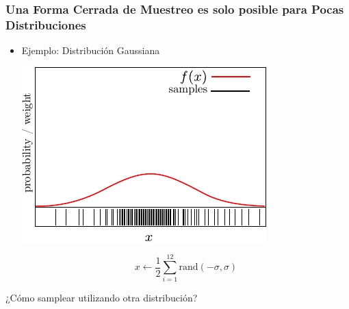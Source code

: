 \begin{frame}
    \frametitle{Una Forma Cerrada de Muestreo es solo posible para Pocas Distribuciones }
    \begin{itemize}
        \item Ejemplo: Distribución Gaussiana
        
        \begin{center}
            \includegraphics[width=0.5\columnwidth]{./images/particle_filter/gaussian_approximation_by_sampling.pdf}
        \end{center}
        
        \begin{equation*}
            x \leftarrow \frac{1}{2} \sum_{i=1}^{12} \text{rand}(-\sigma, \sigma)
        \end{equation*}
    \end{itemize}

    ¿Cómo samplear utilizando otra distribución?



\end{frame}
    


